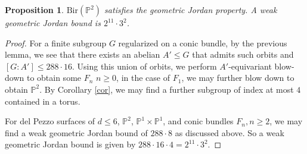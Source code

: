 \documentclass[a4paper,12pt,oneside]{amsart}
\numberwithin{equation}{section}
\newtheorem{proposition}[theorem]{Proposition}
\theoremstyle{definition}
\theoremstyle{remark}
\newcommand{\PP}{\mathbb{P}}
\newcommand{\Ptwo}{\mathbb{P}^2}
\begin{document}
\begin{proposition}
$\mathrm{Bir}(\mathbb P^2)$ satisfies the geometric Jordan property. A weak geometric Jordan bound is $2^{11} \cdot 3^2$. 
\end{proposition}

\begin{proof}
For a finite subgroup $G$ regularized on a conic bundle, by the previous lemma, we see that there exists an abelian $A'\leqslant G$ that admits such orbits and $[G:A']\leq 288 \cdot 16$. Using this union of orbits, we perform $A'$-equivariant blow-down to obtain some $F_n$ $n\geq 0$, in the case of $F_1$, we may further blow down to obtain $\Ptwo$. By Corollary \ref{cor}, we may find a further subgroup of index at most $4$ contained in a torus. 

For del Pezzo surfaces of $d \leq 6$, $\mathbb P^2$, $\PP^1 \times \PP^1$, and conic bundles $F_n, n\geq 2$, we may find a weak geometric Jordan bound of $288 \cdot 8$ as discussed above. So a weak geometric Jordan bound is given by $288\cdot 16 \cdot 4=2^{11} \cdot 3^2$.
 \end{proof}







\end{document}

